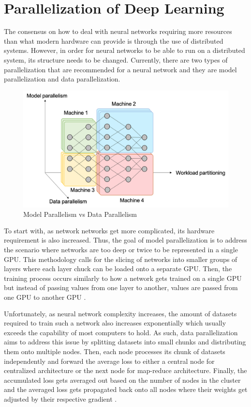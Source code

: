 \documentclass{IEEEtran}
\begin{document}
    \section{Parallelization of Deep Learning}
        The consensus on how to deal with neural networks requiring more resources than what modern hardware can provide is through the use of distributed systems. However, in order for neural networks to be able to run on a distributed system, its structure needs to be changed. Currently, there are two types of parallelization that are recommended for a neural network and they are model parallelization and data parallelization.

        \begin{figure}[!htb]
            \centering
            \captionsetup{justification=centering}
            \includegraphics[width=\linewidth]{Parallelism.png}
            \caption{Model Parallelism vs Data Parallelism \cite{ekanayake}}  
        \end{figure}

        To start with, as network networks get more complicated, its hardware requirement is also increased. Thus, the goal of model parallelization is to address the scenario where networks are too deep or twice to be represented in a single GPU. This methodology calls for the slicing of networks into smaller groups of layers where each layer chuck can be loaded onto a separate GPU. Then, the training process occurs similarly to how a network gets trained on a single GPU but instead of passing values from one layer to another, values are passed from one GPU to another GPU \cite{ben-nun_hoefler_2019}.

        Unfortunately, as neural network complexity increases, the amount of datasets required to train such a network also increases exponentially which usually exceeds the capability of most computers to hold. As such, data parallelization aims to address this issue by splitting datasets into small chunks and distributing them onto multiple nodes. Then, each node processes its chunk of datasets independently and forward the average loss to either a central node for centralized architecture or the next node for map-reduce architecture. Finally, the accumulated loss gets averaged out based on the number of nodes in the cluster and the averaged loss gets propagated back onto all nodes where their weights get adjusted by their respective gradient \cite{ben-nun_hoefler_2019}.
\end{document}
